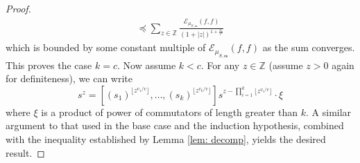 \documentclass[pdflatex,sn-mathphys-num]{sn-jnl}%
\theoremstyle{thmstyleone}%
\theoremstyle{thmstyletwo}%
\theoremstyle{thmstylethree}%
\begin{document}
\begin{proof}
\begin{align*}
   \preccurlyeq   \sum_{z\in \mathbb{Z}}\frac{\mathcal{E}_{\mu_{S,\bm{\alpha}}} (f,f) }{(1 + |z|)^{1+ \frac{v_*}{v^2 }}} 
    \end{align*}
which is bounded by some constant multiple of $\mathcal{E}_{\mu_{S,\bm{\alpha}}} (f,f) $ as the sum converges.  This proves the case $k=c$.
Now assume $k < c$. For any $z\in \mathbb{Z}$ (assume $z>0$ again for definiteness),  we can  write
$$s^z = \left[(s_{1})^{\lfloor z^{ v_1/v }\rfloor }, \ldots, (s_{k})^{\lfloor z^{ v_k/v}\rfloor}\right] s^{
    z - \prod_{i=1}^k \lfloor z^{ v_i/v}\rfloor} \cdot \xi $$
where $\xi$ is a product of power of commutators of length greater than $k$. A similar argument to that used in the base case and the induction hypothesis, combined with the  inequality established by Lemma \ref{lem: decomp}, yields the desired result.

\end{proof}
\end{document}
